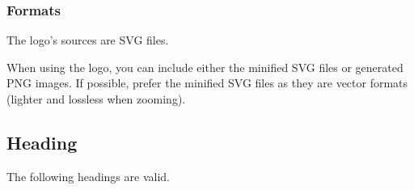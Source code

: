 \documentclass[letterpaper,10pt,english]{sphinxmanual}
\begin{document}
\begin{figure}[htbp]
\centering

\noindent{}
\end{figure}

\begin{figure}[htbp]
\centering

\noindent{}
\end{figure}

\begin{figure}[htbp]
\centering

\noindent{}
\end{figure}


\subsubsection{Formats}
\label{\detokenize{design/design_assets:formats}}
The logo’s sources are SVG files.

When using the logo, you can include either the minified SVG files or generated PNG images.
If possible, prefer the minified SVG files as they are vector formats (lighter and lossless when zooming).


\subsection{Heading}
\label{\detokenize{design/design_assets:heading}}
The following headings are valid.

\begin{figure}[htbp]
\centering

\noindent{}
\end{figure}

\begin{figure}[htbp]
\centering

\noindent{}
\end{figure}

\begin{figure}[htbp]
\centering

\noindent{}
\end{figure}

\begin{figure}[htbp]
\centering

\noindent{}
\end{figure}
\end{document}
